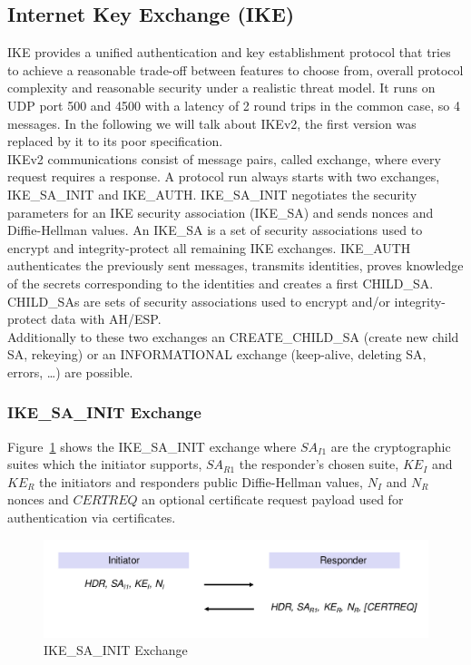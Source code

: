 \subsection{Internet Key Exchange (IKE)}
IKE provides a unified authentication and key establishment protocol that tries to achieve a reasonable trade-off between features to choose from, overall protocol complexity and reasonable security under a realistic threat model.
It runs on UDP port 500 and 4500 with a latency of 2 round trips in the common case, so 4 messages.
In the following we will talk about IKEv2, the first version was replaced by it to its poor specification.\\

IKEv2 communications consist of message pairs, called exchange, where every request requires a response.
A protocol run always starts with two exchanges, IKE\_SA\_INIT and IKE\_AUTH\@.
IKE\_SA\_INIT negotiates the security parameters for an IKE security association (IKE\_SA) and sends nonces and Diffie-Hellman values.
An IKE\_SA is a set of security associations used to encrypt and integrity-protect all remaining IKE exchanges.
IKE\_AUTH authenticates the previously sent messages, transmits identities, proves knowledge of the secrets corresponding to the identities and creates a first CHILD\_SA\@.
CHILD\_SAs are sets of security associations used to encrypt and/or integrity-protect data with AH/ESP.\\
Additionally to these two exchanges an CREATE\_CHILD\_SA (create new child SA, rekeying) or an INFORMATIONAL exchange (keep-alive, deleting SA, errors, \dots) are possible.

\subsubsection{IKE\_SA\_INIT Exchange}
Figure~\ref{fig:ike_sa_init} shows the IKE\_SA\_INIT exchange where $SA_{I1}$ are the cryptographic suites which the initiator supports, $SA_{R1}$ the responder's chosen suite, $KE_I$ and $KE_R$ the initiators and responders public Diffie-Hellman values, $N_I$ and $N_R$ nonces and $CERTREQ$ an optional certificate request payload used for authentication via certificates.
\begin{figure}[H]
  \centering
  \includegraphics[width=.8\textwidth]{figures/ike_sa_init.png}
  \caption{IKE\_SA\_INIT Exchange}\label{fig:ike_sa_init}
\end{figure}


